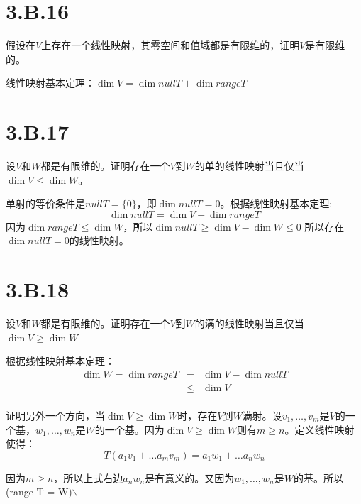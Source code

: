 \documentclass[10pt,a4paper,UTF8]{article}
\begin{document}
\section{3.B.16}
\label{sec:org2276525}


\begin{problem}
假设在\(V\)上存在一个线性映射，其零空间和值域都是有限维的，证明\(V\)是有限维的。
\end{problem}

\begin{answer}
线性映射基本定理：\(\dim V = \dim nullT + \dim rangeT\)
\end{answer}

\section{3.B.17}
\label{sec:org72fb00b}


\begin{problem}
设\(V\)和\(W\)都是有限维的。证明存在一个\(V\)到\(W\)的单的线性映射当且仅当\(\dim V \leq \dim W\)。
\end{problem}

\begin{answer}
单射的等价条件是\(nullT = \{0\}\)，即\(\dim nullT = 0\)。根据线性映射基本定理:\[\dim nullT = \dim V -\dim range T\]
因为\(\dim range T \leq \dim W\)，所以\(\dim nullT \geq \dim V - \dim W \leq 0\) 所以存在\(\dim nullT = 0\)的线性映射。
\end{answer}

\section{3.B.18}
\label{sec:org14b00a8}


\begin{problem}
设\(V\)和\(W\)都是有限维的。证明存在一个\(V\)到\(W\)的满的线性映射当且仅当\(\dim V \geq \dim W\)
\end{problem}

\begin{answer}
根据线性映射基本定理：
\begin{eqnarray*}
\dim W = \dim range T&=&\dim V - \dim nullT \\
&\leq &\dim V \\
\end{eqnarray*}

证明另外一个方向，当\(\dim V \geq \dim W\)时，存在\(V\)到\(W\)满射。设\(v_{1},\ldots ,v_{m}\)是\(V\)的一个基，\(w_{1},\ldots ,w_{n}\)是\(W\)的一个基。因为\(\dim V \geq \dim W\)则有\(m \geq n\)。定义线性映射使得：
\[T(a_{1}v_{1} + \ldots a_{m}v_{m}) = a_{1}w_{1} + \ldots a_{n}w_{n}\] 

因为\(m \geq n\)，所以上式右边\(a_{n}w_{n}\)是有意义的。又因为\(w_{1},\ldots ,w_{n}\)是\(W\)的基。所以(range T = W)$\backslash$
\end{answer}
\end{document}
